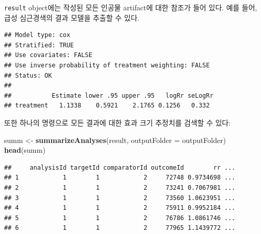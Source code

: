 \documentclass[10.5pt]{book}
\newenvironment{Shaded}{\begin{snugshade}}{\end{snugshade}}
\newcommand{\KeywordTok}[1]{\textcolor[rgb]{0.13,0.29,0.53}{\textbf{#1}}}
\newcommand{\DataTypeTok}[1]{\textcolor[rgb]{0.13,0.29,0.53}{#1}}
\newcommand{\DecValTok}[1]{\textcolor[rgb]{0.00,0.00,0.81}{#1}}
\newcommand{\StringTok}[1]{\textcolor[rgb]{0.31,0.60,0.02}{#1}}
\newcommand{\OperatorTok}[1]{\textcolor[rgb]{0.81,0.36,0.00}{\textbf{#1}}}
\newcommand{\NormalTok}[1]{#1}
\theoremstyle{definition}
\theoremstyle{definition}
\theoremstyle{definition}
\theoremstyle{remark}
\begin{document}
\texttt{result} object에는 작성된 모든 인공물 artifact에 대한 참조가
들어 있다. 예를 들어, 급성 심근경색의 결과 모델을 추출할 수 있다.

\begin{Shaded}
\end{Shaded}

\begin{verbatim}
## Model type: cox
## Stratified: TRUE
## Use covariates: FALSE
## Use inverse probability of treatment weighting: FALSE
## Status: OK
## 
##           Estimate lower .95 upper .95   logRr seLogRr
## treatment   1.1338    0.5921    2.1765 0.1256   0.332
\end{verbatim}

또한 하나의 명령으로 모든 결과에 대한 효과 크기 추정치를 검색할 수 있다:

\begin{Shaded}
\begin{Highlighting}[]
\NormalTok{summ <-}\StringTok{ }\KeywordTok{summarizeAnalyses}\NormalTok{(result, }\DataTypeTok{outputFolder =}\NormalTok{ outputFolder)}
\KeywordTok{head}\NormalTok{(summ)}
\end{Highlighting}
\end{Shaded}

\begin{verbatim}
##     analysisId targetId comparatorId outcomeId        rr ...
## 1            1        1            2     72748 0.9734698 ...
## 2            1        1            2     73241 0.7067981 ...
## 3            1        1            2     73560 1.0623951 ...
## 4            1        1            2     75911 0.9952184 ...
## 5            1        1            2     76786 1.0861746 ...
## 6            1        1            2     77965 1.1439772 ...
\end{verbatim}
\end{document}
